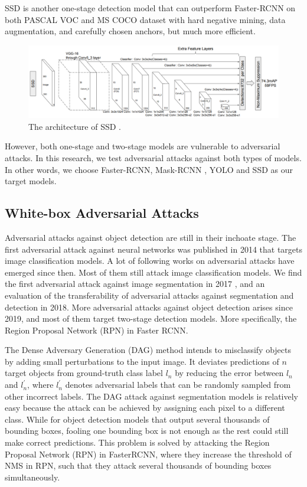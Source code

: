 SSD is another one-stage detection model that can outperform Faster-RCNN on both PASCAL VOC and MS COCO dataset with hard negative mining, data augmentation, and carefully chosen anchors, but much more efficient.

\begin{figure}[H]
\centering
\includegraphics[scale=0.6]{figures/chapter_detection/ssd.png}
\caption{The architecture of SSD \citep{liu2016ssd}.}
\label{fig.ssd}
\end{figure}

However, both one-stage and two-stage models are vulnerable to adversarial attacks. In this research, we test adversarial attacks against both types of models. In other words, we choose Faster-RCNN, Mask-RCNN \citep{he2017mask}, YOLO and SSD as our target models.


\subsection{White-box Adversarial Attacks}

Adversarial attacks against object detection are still in their inchoate stage. The first adversarial attack against neural networks was published in 2014 that targets image classification models. A lot of following works on adversarial attacks have emerged since then. Most of them still attack image classification models. We find the first adversarial attack against image segmentation in 2017 \citep{fischer2017adversarial}, and an evaluation of the transferability of adversarial attacks against segmentation and detection \citep{gurbaxani2018traits} in 2018. More adversarial attacks against object detection arises since 2019, and most of them target two-stage detection models. More specifically, the Region Proposal Network (RPN) in Faster RCNN.

The Dense Adversary Generation (DAG) \citep{xie2017adversarial} method intends to misclassify objects by adding small perturbations to the input image. It deviates predictions of $n$ target objects from ground-truth class label $l_n$ by reducing the error between $l_n$ and $l^{'}_{n}$, where $l^{'}_{n}$ denotes adversarial labels that can be randomly sampled from other incorrect labels. The DAG attack against segmentation models is relatively easy because the attack can be achieved by assigning each pixel to a different class. While for object detection models that output several thousands of bounding boxes, fooling one bounding box is not enough as the rest could still make correct predictions. This problem is solved by attacking the Region Proposal Network (RPN) in FasterRCNN, where they increase the threshold of NMS in RPN, such that they attack several thousands of bounding boxes simultaneously.

